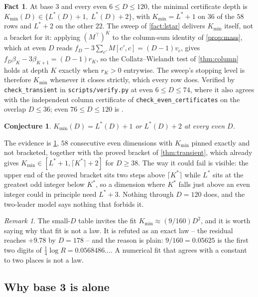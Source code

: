 \documentclass[11pt]{amsart}
\newtheorem{conjecture}[theorem]{Conjecture}
\theoremstyle{definition}
\newtheorem{fact}[theorem]{Fact}
\theoremstyle{remark}
\newtheorem{remark}[theorem]{Remark}
\begin{document}
\begin{fact}
\label{fact:transient}
At base $3$ and every even $6 \le D \le 120$, the minimal certificate depth is $K_{\min}(D) \in \{L^{*}(D)+1,\; L^{*}(D)+2\}$, with $K_{\min} = L^{*}+1$ on $36$ of the $58$ rows and $L^{*}+2$ on the other $22$. The sweep of \cref{fact:lstar} delivers $K_{\min}$ itself, not a bracket for it: applying $(M^{\top})^K$ to the column-sum identity of \cref{prop:mass}, which at even $D$ reads $f_D - 3\sum_{c'}M[c',c] = (D-1)v_c$, gives $f_D\beta_K - 3\beta_{K+1} = (D-1)r_K$, so the Collatz--Wielandt test of \cref{thm:column} holds at depth $K$ exactly when $r_K > 0$ entrywise. The sweep's stopping level is therefore $K_{\min}$ whenever it closes strictly, which every row does. Verified by \texttt{check\_transient} in \texttt{scripts/verify.py} at even $6 \le D \le 74$, where it also agrees with the independent column certificate of \texttt{check\_even\_certificates} on the overlap $D \le 36$; even $76 \le D \le 120$ is \cite{lab-transient}.
\end{fact}

\begin{conjecture}
\label{con:kmin}
$K_{\min}(D) = L^{*}(D) + 1$ or $L^{*}(D)+2$ at every even $D$.
\end{conjecture}

The evidence is \cref{fact:transient}, $58$ consecutive even dimensions with $K_{\min}$ pinned exactly and not bracketed, together with the proved bracket of \cref{thm:transient}, which already gives $K_{\min} \in [L^{*}+1, \lceil K^{*}\rceil + 2]$ for $D \ge 38$. The way it could fail is visible: the upper end of the proved bracket sits two steps above $\lceil K^{*}\rceil$ while $L^{*}$ sits at the greatest odd integer below $K^{*}$, so a dimension where $K^{*}$ falls just above an even integer could in principle need $L^{*}+3$. Nothing through $D = 120$ does, and the two-leader model says nothing that forbids it.

\begin{remark}
\label{rem:notafit}
The small-$D$ table invites the fit $K_{\min} \approx (9/160)D^2$, and it is worth saying why that fit is not a law. It is refuted as an exact law -- the residual reaches $+9.78$ by $D = 178$ -- and the reason is plain: $9/160 = 0.05625$ is the first two digits of $\tfrac14\log R = 0.0568486\ldots$. A numerical fit that agrees with a constant to two places is not a law.
\end{remark}

\subsection*{Why base 3 is alone}
\end{document}
